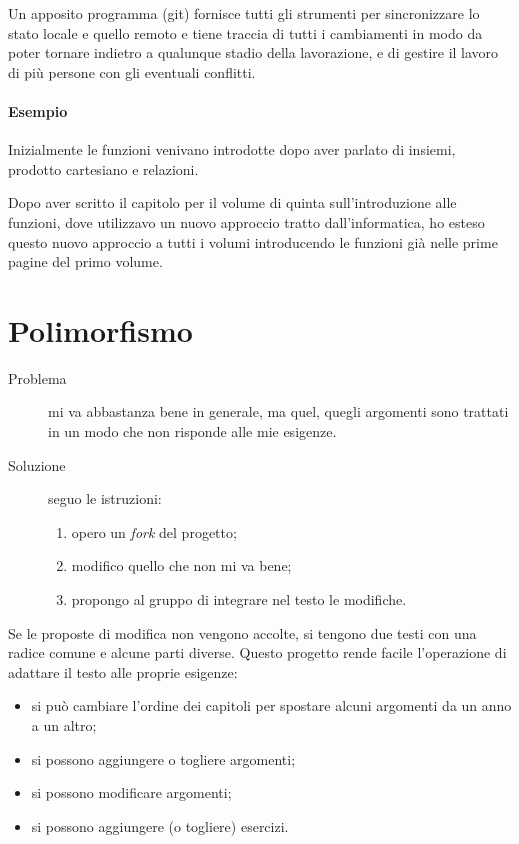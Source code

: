 \documentclass[a4paper,10pt]{article}
\begin{document}
Un apposito programma (git) fornisce tutti gli strumenti per 
sincronizzare lo stato locale e quello remoto e tiene traccia di tutti 
i cambiamenti in modo da poter tornare indietro a qualunque stadio della 
lavorazione, e di gestire il lavoro di più persone con gli eventuali 
conflitti.

\paragraph{Esempio} Inizialmente le funzioni venivano introdotte dopo aver 
parlato di insiemi, prodotto cartesiano e relazioni.

Dopo aver scritto il capitolo per il volume di quinta sull'introduzione 
alle funzioni, dove utilizzavo un nuovo approccio tratto dall'informatica, 
ho esteso questo nuovo approccio a tutti i volumi introducendo le funzioni 
già nelle prime pagine del primo volume.

\medskip
{}


\section{Polimorfismo}

\begin{description}
\item [Problema ] mi va abbastanza bene in generale, ma quel, quegli 
argomenti sono trattati in un modo che non risponde alle mie esigenze.
\item [Soluzione ] seguo le istruzioni:
\begin{enumerate} [noitemsep]
\item opero un \emph{fork} del progetto;
\item modifico quello che non mi va bene;
\item propongo al gruppo di integrare nel testo le modifiche.
\end{enumerate}
\end{description}

Se le proposte di modifica non vengono accolte, si tengono due testi con una 
radice comune e alcune parti diverse.
Questo progetto rende facile l'operazione di adattare il testo alle proprie 
esigenze:
\begin{itemize} [noitemsep]
\item si può cambiare l'ordine dei capitoli per spostare alcuni argomenti da 
un anno a un altro;
\item si possono aggiungere o togliere argomenti;
\item si possono modificare argomenti;
\item si possono aggiungere (o togliere) esercizi.
\end{itemize}
\end{document}
